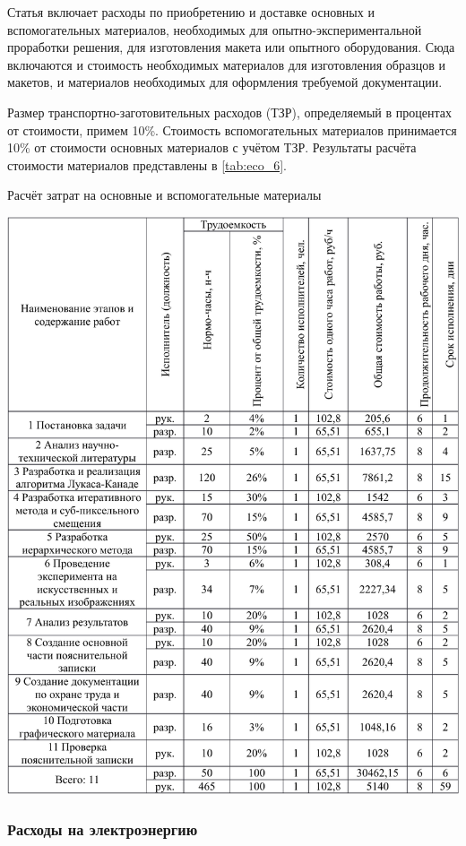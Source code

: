Статья включает расходы по приобретению и доставке основных и вспомогательных материалов, необходимых для опытно-экспериментальной проработки решения, для изготовления макета или опытного оборудования. Сюда включаются и стоимость необходимых материалов для изготовления образцов и макетов, и материалов необходимых для оформления требуемой документации.

Размер транспортно-заготовительных расходов (ТЗР), определяемый в процентах от стоимости, примем 10\%. Стоимость вспомогательных материалов принимается 10\% от стоимости основных материалов с учётом ТЗР. Результаты расчёта стоимости материалов представлены в \ref{tab:eco_6}.

\begin{table}[!ht]
\caption{Расчёт затрат на основные и вспомогательные материалы}
\centering
\includegraphics[page=6, width=1\linewidth]{econom_table.pdf}
\label{tab:eco_6}
\end{table}

\subsubsection{Расходы на электроэнергию}


